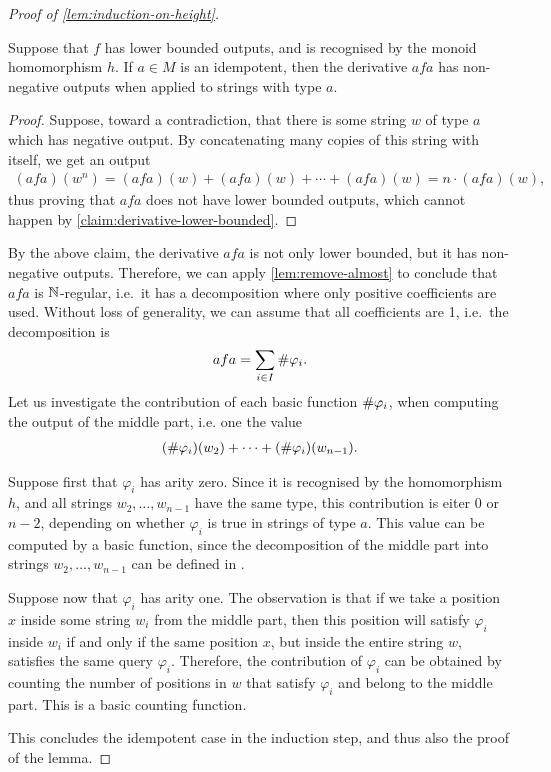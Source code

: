 \begin{proof}[Proof of \cref{lem:induction-on-height}]
\begin{claim}
    Suppose that $f$ has lower bounded outputs, and is recognised by the monoid homomorphism $h$. If $a\in M$ is an idempotent, then the derivative $afa$ has non-negative outputs when applied to strings with type $a$. 
\end{claim}
\begin{proof}
    Suppose, toward a contradiction, that there is some string $w$ of type $a$ which has negative output. By concatenating many copies of this string with itself, we get an output 
    \begin{align*}
    (afa)(w^n) = (afa)(w) + (afa)(w) + \cdots + (afa)(w) = n \cdot (afa)(w),
    \end{align*}
    thus proving that $afa$ does not have lower bounded  outputs, which cannot happen by \cref{claim:derivative-lower-bounded}.
\end{proof}

By the above claim, the derivative $afa$ is not only lower bounded, but it has non-negative outputs. Therefore, we can apply \cref{lem:remove-almost} to conclude that $afa$ is ${\mathbb N}$-regular, i.e.~it has a decomposition where only positive coefficients are used. Without loss of generality, we can assume that all coefficients are 1, i.e.~the decomposition is 
\begin{align*}
afa = \sum_{i \in I} \#{\varphi}_i.
\end{align*}
Let us investigate the contribution of each basic function $\#{\varphi}_i$, when computing the output of the middle part, i.e. one the value 
\begin{align*}
    (\#{\varphi}_i)(w_2) +  \cdots + (\#{\varphi}_i)(w_{n-1}).
\end{align*}

Suppose first that $\varphi_i$ has arity zero. Since it is recognised by the homomorphism $h$, and all strings $w_2,\ldots,w_{n-1}$ have the same type, this contribution is eiter $0$ or $n-2$, depending on whether $\varphi_i$ is true in strings of type $a$. This value can be computed by a basic function, since the decomposition of the middle part into strings $w_2,\ldots,w_{n-1}$ can be defined in \mso. 

Suppose now that $\varphi_i$ has arity one. The observation is that if we take a position $x$ inside some string $w_i$ from the middle part, then this position will satisfy $\varphi_i$ inside $w_i$ if and only if the same position $x$, but inside the entire string $w$, satisfies the same query $\varphi_i$. Therefore, the contribution of $\varphi_i$ can be obtained by counting the number of positions in $w$ that satisfy $\varphi_i$ and belong to the middle part. This is a basic counting function. 

This concludes the idempotent case in the induction step, and thus also the proof of the lemma. 
\end{proof}



